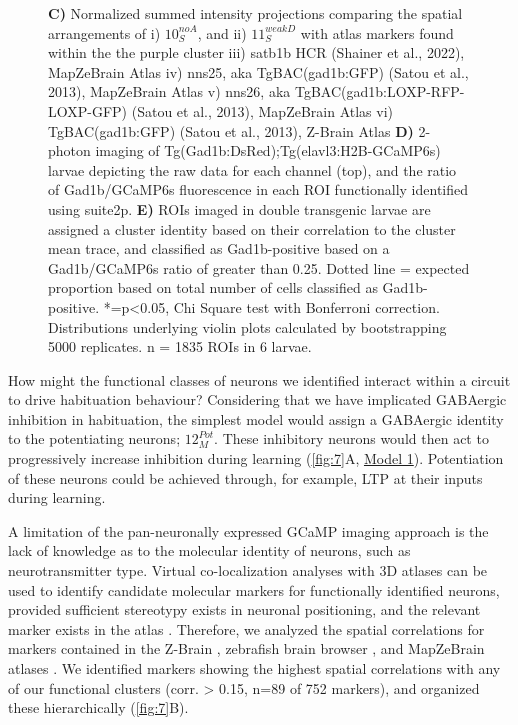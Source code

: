 \documentclass[9pt,lineno]{RandlettLab_elife}
\begin{document}
\begin{figure}
\begin{fullwidth}
\begin{center}
{\textbf{C)} Normalized summed intensity projections comparing the spatial arrangements of i) $10_{S}^{noA}$, and ii) $11_{S}^{weakD}$
with atlas markers found within the the purple cluster
iii) satb1b HCR (Shainer et al., 2022), MapZeBrain Atlas
iv) nns25, aka TgBAC(gad1b:GFP) (Satou et al., 2013), MapZeBrain Atlas
v) nns26, aka TgBAC(gad1b:LOXP-RFP-LOXP-GFP) (Satou et al., 2013), MapZeBrain Atlas
vi) TgBAC(gad1b:GFP) (Satou et al., 2013), Z-Brain Atlas
\textbf{D)} 2-photon imaging of Tg(Gad1b:DsRed);Tg(elavl3:H2B-GCaMP6s) larvae depicting the raw data for each channel (top), and the ratio of Gad1b/GCaMP6s fluorescence in each ROI functionally identified using suite2p. 
\textbf{E)} ROIs imaged in double transgenic larvae are assigned a cluster identity based on their correlation to the cluster mean trace, and classified as Gad1b-positive based on a Gad1b/GCaMP6s ratio of greater than 0.25. Dotted line = expected proportion based on total number of cells classified as Gad1b-positive. *=p<0.05, Chi Square test with Bonferroni correction. Distributions underlying violin plots calculated by bootstrapping 5000 replicates. n = 1835 ROIs in 6 larvae. 
}
\label{fig:7}
\end{center}
\end{fullwidth}
\end{figure}

How might the functional classes of neurons we identified interact within a circuit to drive habituation behaviour? Considering that we have implicated GABAergic inhibition in habituation, the simplest model would assign a GABAergic identity to the potentiating neurons; $12_{M}^{Pot}$. These inhibitory neurons would then act to progressively increase inhibition during learning (\autoref{fig:7}A, \underline{Model 1}). Potentiation of these neurons could be achieved through, for example, LTP at their inputs during learning. 

A limitation of the pan-neuronally expressed GCaMP imaging approach is the lack of knowledge as to the molecular identity of neurons, such as neurotransmitter type. Virtual co-localization analyses with 3D atlases can be used to identify candidate molecular markers for functionally identified neurons, provided sufficient stereotypy exists in neuronal positioning, and the relevant marker exists in the atlas \cite{Dunn2016-vt, Randlett2015-hy}. Therefore, we analyzed the spatial correlations for markers contained in the Z-Brain \cite{Randlett2015-hy}, zebrafish brain browser \cite{Gupta2018-ik, Marquart2017-na, Tabor2018-bw}, and MapZeBrain atlases \cite{Kunst2018-az, Shainer2022-sn}. We identified markers showing the highest spatial correlations with any of our functional clusters (corr. > 0.15, n=89 of 752 markers), and organized these hierarchically (\autoref{fig:7}B).
\end{document}
